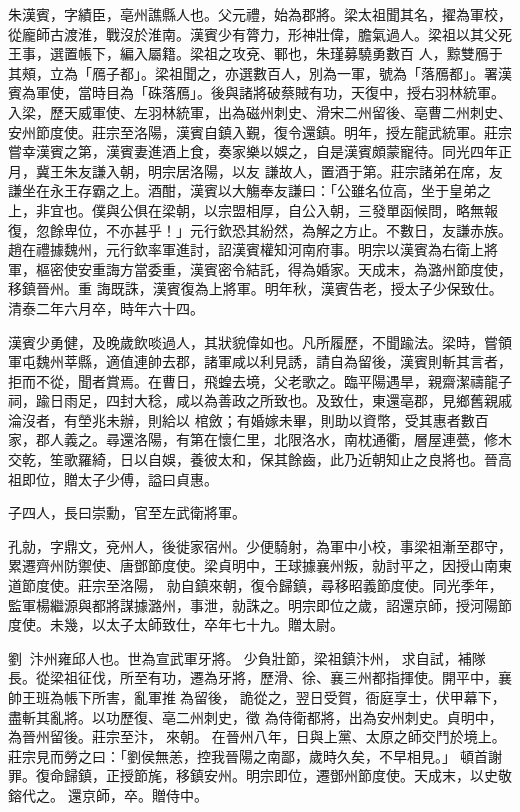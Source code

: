 \begin{pinyinscope}
 朱漢賓，字績臣，亳州譙縣人也。父元禮，始為郡將。梁太祖聞其名，擢為軍校，從龐師古渡淮，戰沒於淮南。漢賓少有膂力，形神壯偉，膽氣過人。梁祖以其父死王事，選置帳下，編入屬籍。梁祖之攻兗、鄆也，朱瑾募驍勇數百
 人，黥雙鴈于其頰，立為「鴈子都」。梁祖聞之，亦選數百人，別為一軍，號為「落鴈都」。署漢賓為軍使，當時目為「硃落鴈」。後與諸將破蔡賊有功，天復中，授右羽林統軍。入梁，歷天威軍使、左羽林統軍，出為磁州刺史、滑宋二州留後、亳曹二州刺史、安州節度使。莊宗至洛陽，漢賓自鎮入覲，復令還鎮。明年，授左龍武統軍。莊宗嘗幸漢賓之第，漢賓妻進酒上食，奏家樂以娛之，自是漢賓頗蒙寵待。同光四年正月，冀王朱友謙入朝，明宗居洛陽，以友
 謙故人，置酒于第。莊宗諸弟在席，友謙坐在永王存霸之上。酒酣，漢賓以大觴奉友謙曰：「公雖名位高，坐于皇弟之上，非宜也。僕與公俱在梁朝，以宗盟相厚，自公入朝，三發單函候問，略無報復，忽餘卑位，不亦甚乎！」元行欽恐其紛然，為解之方止。不數日，友謙赤族。趙在禮據魏州，元行欽率軍進討，詔漢賓權知河南府事。明宗以漢賓為右衛上將軍，樞密使安重誨方當委重，漢賓密令結託，得為婚家。天成末，為潞州節度使，移鎮晉州。重
 誨既誅，漢賓復為上將軍。明年秋，漢賓告老，授太子少保致仕。清泰二年六月卒，時年六十四。



 漢賓少勇健，及晚歲飲啖過人，其狀貌偉如也。凡所履歷，不聞踰法。梁時，嘗領軍屯魏州莘縣，適值連帥去郡，諸軍咸以利見誘，請自為留後，漢賓則斬其言者，拒而不從，聞者賞焉。在曹日，飛蝗去境，父老歌之。臨平陽遇旱，親齋潔禱龍子祠，踰日雨足，四封大稔，咸以為善政之所致也。及致仕，東還亳郡，見鄉舊親戚淪沒者，有塋兆未辦，則給以
 棺斂；有婚嫁未畢，則助以資幣，受其惠者數百家，郡人義之。尋還洛陽，有第在懷仁里，北限洛水，南枕通衢，層屋連甍，修木交乾，笙歌羅綺，日以自娛，養彼太和，保其餘齒，此乃近朝知止之良將也。晉高祖即位，贈太子少傅，謚曰貞惠。



 子四人，長曰崇勳，官至左武衛將軍。



 孔勍，字鼎文，兗州人，後徙家宿州。少便騎射，為軍中小校，事梁祖漸至郡守，累遷齊州防禦使、唐鄧節度使。梁貞明中，王球據襄州叛，勍討平之，因授山南東道節度使。莊宗至洛陽，
 勍自鎮來朝，復令歸鎮，尋移昭義節度使。同光季年，監軍楊繼源與都將謀據潞州，事泄，勍誅之。明宗即位之歲，詔還京師，授河陽節度使。未幾，以太子太師致仕，卒年七十九。贈太尉。



 劉，汴州雍邱人也。世為宣武軍牙將。少負壯節，梁祖鎮汴州，求自試，補隊長。從梁祖征伐，所至有功，遷為牙將，歷滑、徐、襄三州都指揮使。開平中，襄帥王班為帳下所害，亂軍推為留後，詭從之，翌日受賀，衙庭享士，伏甲幕下，盡斬其亂將。以功歷復、亳二州刺史，徵
 為侍衛都將，出為安州刺史。貞明中，為晉州留後。莊宗至汴，來朝。在晉州八年，日與上黨、太原之師交鬥於境上。莊宗見而勞之曰：「劉侯無恙，控我晉陽之南鄙，歲時久矣，不早相見。」頓首謝罪。復命歸鎮，正授節旄，移鎮安州。明宗即位，遷鄧州節度使。天成末，以史敬鎔代之。還京師，卒。贈侍中。




\end{pinyinscope}
